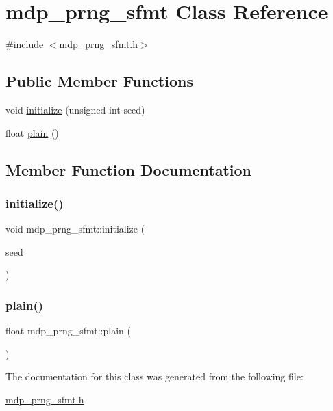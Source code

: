 \hypertarget{classmdp__prng__sfmt}{}\section{mdp\+\_\+prng\+\_\+sfmt Class Reference}
\label{classmdp__prng__sfmt}


{\ttfamily \#include $<$mdp\+\_\+prng\+\_\+sfmt.\+h$>$}

\subsection*{Public Member Functions}
\begin{DoxyCompactItemize}
\item 
void \hyperlink{classmdp__prng__sfmt_a18a792e2e4ec0c846ff57a33b03500f9}{initialize} (unsigned int seed)
\item 
float \hyperlink{classmdp__prng__sfmt_af03ee974f6f6ff50c685457e7805fb35}{plain} ()
\end{DoxyCompactItemize}


\subsection{Member Function Documentation}
\mbox{\label{classmdp__prng__sfmt_a18a792e2e4ec0c846ff57a33b03500f9}} 
\subsubsection{\texorpdfstring{initialize()}{initialize()}}
{\footnotesize\ttfamily void mdp\+\_\+prng\+\_\+sfmt\+::initialize (\begin{DoxyParamCaption}\item[{unsigned int}]{seed }\end{DoxyParamCaption})\hspace{0.3cm}{\ttfamily [inline]}}

\mbox{\label{classmdp__prng__sfmt_af03ee974f6f6ff50c685457e7805fb35}} 
\subsubsection{\texorpdfstring{plain()}{plain()}}
{\footnotesize\ttfamily float mdp\+\_\+prng\+\_\+sfmt\+::plain (\begin{DoxyParamCaption}{ }\end{DoxyParamCaption})\hspace{0.3cm}{\ttfamily [inline]}}



The documentation for this class was generated from the following file\+:\begin{DoxyCompactItemize}
\item 
\hyperlink{mdp__prng__sfmt_8h}{mdp\+\_\+prng\+\_\+sfmt.\+h}\end{DoxyCompactItemize}
